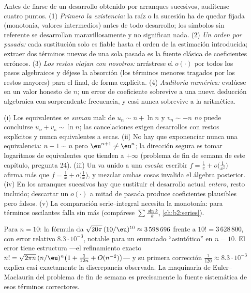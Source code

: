 \begin{method}\label{met:b2:comparison:checklist}
Antes de fiarse de un desarrollo obtenido por arranques sucesivos,
audítense cuatro puntos. (1) \emph{Primero la existencia:} la raíz
o la sucesión ha de quedar fijada (monotonía, valores intermedios)
antes de todo desarrollo; los símbolos sin referente se desarrollan
maravillosamente y no significan nada. (2) \emph{Un orden por
pasada:} cada sustitución solo es fiable hasta el orden de la
estimación introducida; extraer dos términos nuevos de una sola
pasada es la fuente clásica de coeficientes erróneos. (3)
\emph{Los restos viajan con nosotros:} arrástrese el $o(\cdot)$ por
todos los pasos algebraicos y déjese la absorción (los términos
menores tragados por los restos mayores) para el final, de forma
explícita. (4) \emph{Auditoría numérica:} evalúese en un valor
honesto de $n$; un error de coeficiente sobrevive a una nueva
deducción algebraica con sorprendente frecuencia, y casi nunca
sobrevive a la aritmética.
\end{method}

\begin{remark}\label{rem:b2:comparison:pitfalls}
(i) Los equivalentes se \emph{suman} mal: de $u_n \sim n + \ln n$ y
$v_n \sim -n$ \emph{no} puede concluirse $u_n + v_n \sim \ln n$;
las cancelaciones exigen desarrollos con restos explícitos y nunca
equivalentes a secas. (ii) No hay que exponenciar nunca una
equivalencia: $n + 1 \sim n$ pero $\eu^{n+1} \not\sim \eu^n$; la
dirección segura es tomar logaritmos de equivalentes que tienden a
$+\infty$ (problema de fin de semana de este capítulo, pregunta
24). (iii) Un  va unido a una \emph{escala}:
escribir $f = \frac1x + o\bigl(\frac1{x^2}\bigr)$ afirma más que $f
= \frac1x + o\bigl(\frac1x\bigr)$, y mezclar ambas cosas invalida
el álgebra posterior. (iv) En los arranques sucesivos hay que
sustituir el desarrollo actual \emph{entero}, resto incluido;
descartar un $o(\cdot)$ a mitad de pasada produce coeficientes
plausibles pero falsos. (v) La comparación serie--integral necesita
la monotonía: para términos oscilantes falla sin más (compárese
$\sum\frac{\sin k}k$, \cref{ch:b2:series}).
\end{remark}

\begin{example}\label{ex:b2:comparison:stirlingnum}
Para $n = 10$: la fórmula da $\sqrt{20\pi}\,(10/\eu)^{10} \approx
3\,598\,696$ frente a $10! = 3\,628\,800$, con error relativo
$8.3\cdot10^{-3}$, notable para un enunciado ``asintótico'' en $n =
10$. El error tiene estructura ---el refinamiento exacto $n! =
\sqrt{2\pi n}\,(n/\eu)^n\bigl(1 + \frac1{12n} + O(n^{-2})\bigr)$---
y su primera corrección $\frac1{120} \approx 8.3\cdot10^{-3}$
explica casi exactamente la discrepancia observada. La maquinaria
de Euler--Maclaurin del problema de fin de semana es precisamente
la fuente sistemática de esos términos correctores.
\end{example}

